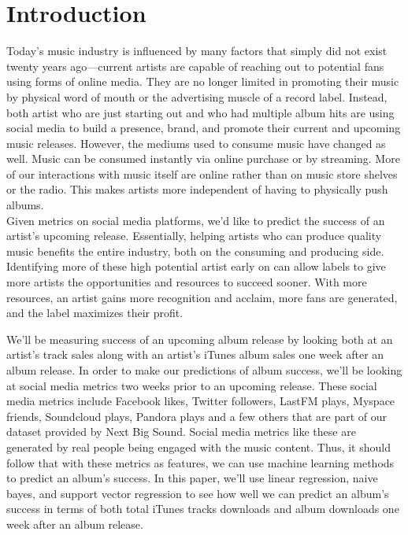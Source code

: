 \documentclass[conference]{IEEEtran}
\begin{document}
\section{Introduction}
Today's music industry is influenced by many factors that simply did not exist twenty years ago---current artists are capable of reaching out to potential fans using forms of online media. They are no longer limited in promoting their music by physical word of mouth or the advertising muscle of a record label. Instead, both artist who are just starting out and who had multiple album hits are using social media to build a presence, brand, and promote their current and upcoming music releases. However, the mediums used to consume music have changed as well. Music can be consumed instantly via online purchase or by streaming. More of our interactions with music itself are online rather than on music store shelves or the radio. This makes artists more independent of having to physically push albums.\\

Given metrics on social media platforms, we'd like to predict the success of an artist's upcoming release. Essentially, helping artists who can produce quality music benefits the entire industry, both on the consuming and producing side. Identifying more of these high potential artist early on can allow labels to give more artists the opportunities and resources to succeed sooner. With more resources, an artist gains more recognition and acclaim, more fans are generated, and the label maximizes their profit.

We'll be measuring success of an upcoming album release by looking both at an artist's track sales along with an artist's iTunes album sales one week after an album release. In order to make our predictions of album success, we'll be looking at social media metrics two weeks prior to an upcoming release. These social media metrics include Facebook likes, Twitter followers, LastFM plays, Myspace friends, Soundcloud plays, Pandora plays and a few others that are part of our dataset provided by Next Big Sound. Social media metrics like these are generated by real people being engaged with the music content. Thus, it should follow that with these metrics as features, we can use machine learning methods to predict an album's success. In this paper, we'll use linear regression, naive bayes, and support vector regression to see how well we can predict an album's success in terms of both total iTunes tracks downloads and album downloads one week after an album release.\\
\end{document}
